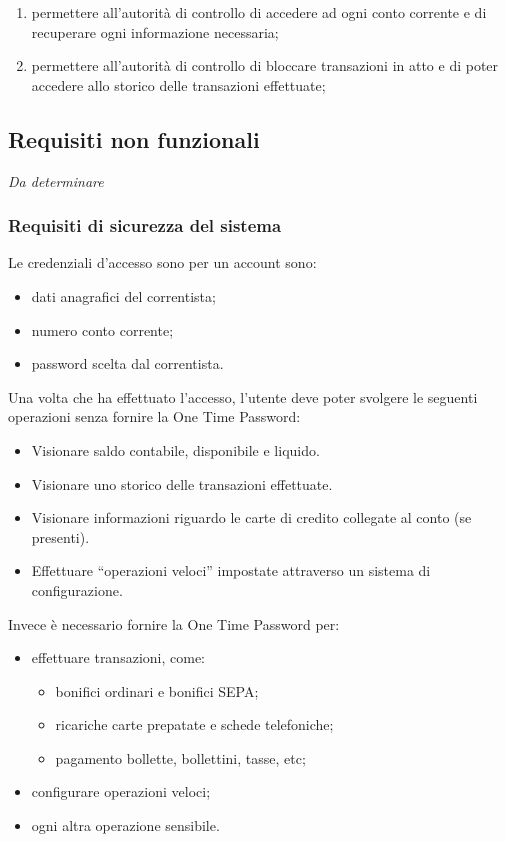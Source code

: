 \begin{enumerate}
\item permettere all'autorità di controllo di accedere ad ogni conto corrente e di recuperare ogni informazione necessaria;
\item permettere all'autorità di controllo di bloccare transazioni in atto e di poter accedere allo storico delle transazioni effettuate;

\end{enumerate}

\subsection{Requisiti non funzionali}

\emph{Da determinare}

\subsubsection{Requisiti di sicurezza del sistema}
 
Le credenziali d'accesso sono per un account sono:
\begin{itemize}
	\item dati anagrafici del correntista;
	\item numero conto corrente;
	\item password scelta dal correntista.
\end{itemize}
	
Una volta che ha effettuato l'accesso,  l'utente deve poter svolgere le seguenti operazioni senza fornire la One Time Password:
\begin{itemize}
	\item Visionare saldo contabile, disponibile e liquido.
	\item Visionare uno storico delle transazioni effettuate.
	\item Visionare informazioni riguardo le carte di credito collegate al conto (se presenti).
	\item Effettuare ``operazioni veloci'' impostate attraverso un sistema di configurazione.
\end{itemize}

Invece è necessario fornire la One Time Password per:
\begin{itemize}
	\item effettuare transazioni, come:
	\begin{itemize}
		\item bonifici ordinari e bonifici SEPA;
		\item ricariche carte prepatate e schede telefoniche;
		\item pagamento bollette, bollettini, tasse, etc;
	\end{itemize}
	\item configurare operazioni veloci;
	\item ogni altra operazione sensibile.
\end{itemize}

